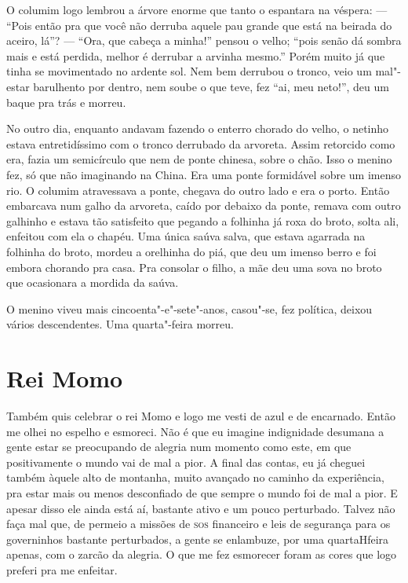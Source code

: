 O columim logo lembrou a árvore enorme que tanto o espantara na véspera:
--- ``Pois então pra que você não derruba aquele pau grande que está na
beirada do aceiro, lá''? --- ``Ora, que cabeça a minha!'' pensou o velho;
``pois senão dá sombra mais e está perdida, melhor é derrubar a arvinha
mesmo.'' Porém muito já que tinha se movimentado no ardente sol. Nem bem
derrubou o tronco, veio um mal"-estar barulhento por dentro, nem soube o
que teve, fez ``ai, meu neto!'', deu um baque pra trás e morreu.

No outro dia, enquanto andavam fazendo o enterro chorado do velho, o
netinho estava entretidíssimo com o tronco derrubado da arvoreta. Assim
retorcido como era, fazia um semicírculo que nem de ponte chinesa, sobre
o chão. Isso o menino fez, só que não imaginando na China. Era uma ponte
formidável sobre um imenso rio. O columim atravessava a ponte, chegava
do outro lado e era o porto. Então embarcava num galho da arvoreta,
caído por debaixo da ponte, remava com outro galhinho e estava tão
satisfeito que pegando a folhinha já roxa do broto, solta ali, enfeitou
com ela o chapéu. Uma única saúva salva, que estava agarrada na folhinha
do broto, mordeu a orelhinha do piá, que deu um imenso berro e foi
embora chorando pra casa. Pra consolar o filho, a mãe deu uma sova no
broto que ocasionara a mordida da saúva.

O menino viveu mais cincoenta"-e"-sete"-anos, casou"-se, fez política,
deixou vários descendentes. Uma quarta"-feira morreu.

\chapter{Rei Momo}

Também quis celebrar o rei Momo e logo me vesti de azul e de encarnado.
Então me olhei no espelho e esmoreci. Não é que eu imagine indignidade
desumana a gente estar se preocupando de alegria num momento como este,
em que positivamente o mundo vai de mal a pior. A final das contas, eu
já cheguei também àquele alto de montanha, muito avançado no caminho da
experiência, pra estar mais ou menos desconfiado de que sempre o mundo
foi de mal a pior. E apesar disso ele ainda está aí, bastante ativo e um
pouco perturbado. Talvez não faça mal que, de permeio a missões de \textsc{sos}
financeiro e leis de segurança para os governinhos bastante perturbados,
a gente se enlambuze, por uma quartaHfeira apenas, com o zarcão da
alegria. O que me fez esmorecer foram as cores que logo preferi pra me
enfeitar.

